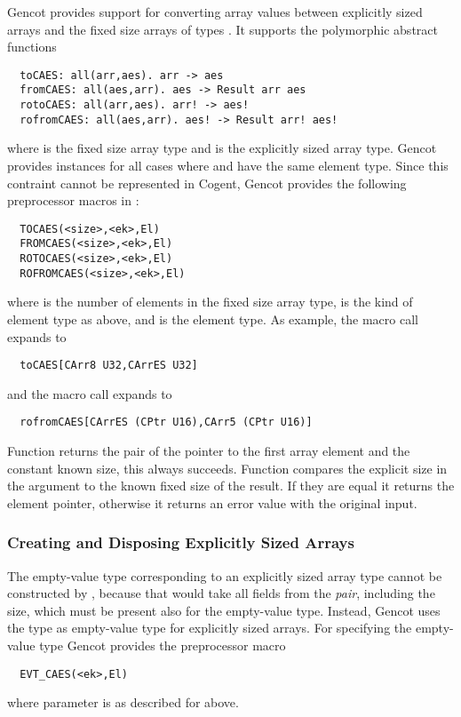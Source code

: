 Gencot provides support for converting array values between explicitly sized arrays and the fixed size arrays of types
. It supports the polymorphic abstract functions
\begin{verbatim}
  toCAES: all(arr,aes). arr -> aes
  fromCAES: all(aes,arr). aes -> Result arr aes
  rotoCAES: all(arr,aes). arr! -> aes!
  rofromCAES: all(aes,arr). aes! -> Result arr! aes!
\end{verbatim}
where  is the fixed size array type and  is the explicitly sized array type. Gencot provides instances
for all cases where  and  have the same element type. Since this contraint cannot be represented in
Cogent, Gencot provides the following preprocessor macros in :
\begin{verbatim}
  TOCAES(<size>,<ek>,El)
  FROMCAES(<size>,<ek>,El)
  ROTOCAES(<size>,<ek>,El)
  ROFROMCAES(<size>,<ek>,El)
\end{verbatim}
where  is the number of elements in the fixed size array type,  is the kind of element type as above, 
and  is the element type. As example, the macro call  expands to
\begin{verbatim}
  toCAES[CArr8 U32,CArrES U32]
\end{verbatim}
and the macro call  expands to
\begin{verbatim}
  rofromCAES[CArrES (CPtr U16),CArr5 (CPtr U16)]
\end{verbatim}

Function  returns the pair of the pointer to the first array element and the constant known size, this
always succeeds. Function  compares the explicit size in the argument to the known fixed size of the result.
If they are equal it returns the element pointer, otherwise it returns an error value with the original input.

\subsubsection{Creating and Disposing Explicitly Sized Arrays}

The empty-value type corresponding to an explicitly sized array type  cannot be constructed by 
, because that would take all fields from the \textit{pair}, including the size, which must be present
also for the empty-value type. Instead, Gencot uses the type  as empty-value type for explicitly sized arrays.
For specifying the empty-value type Gencot provides the preprocessor macro
\begin{verbatim}
  EVT_CAES(<ek>,El)
\end{verbatim}
where parameter  is as described for  above.


